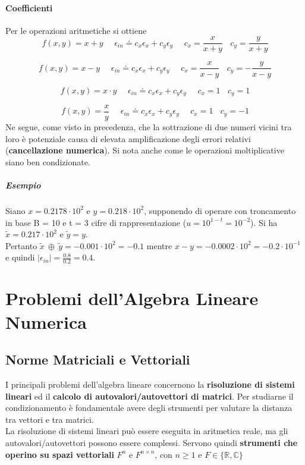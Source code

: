 \documentclass[10pt]{book}
\begin{document}
\subsubsection{Coefficienti}
Per le operazioni aritmetiche si ottiene
$$f(x, y) = x + y\:\:\:\:\:\:\epsilon_{in} \doteq c_x\epsilon_x + c_y\epsilon_y\:\:\:\:\:\:c_x=\frac{x}{x + y}\:\:\:\:c_y = \frac{y}{x + y}$$

$$f(x, y) = x - y\:\:\:\:\:\:\epsilon_{in} \doteq c_x\epsilon_x + c_y\epsilon_y\:\:\:\:\:\:c_x=\frac{x}{x - y}\:\:\:\:c_y = -\frac{y}{x - y}$$

$$f(x, y) = x \cdot y\:\:\:\:\:\:\epsilon_{in} \doteq c_x\epsilon_x + c_y\epsilon_y\:\:\:\:\:\:c_x= 1\:\:\:\:c_y = 1$$

$$f(x, y) = \frac{x}{y}\:\:\:\:\:\:\epsilon_{in} \doteq c_x\epsilon_x + c_y\epsilon_y\:\:\:\:\:\:c_x= 1\:\:\:\:c_y = -1$$
Ne segue, come visto in precedenza, che la sottrazione di due numeri vicini tra loro è potenziale causa di elevata amplificazione degli errori relativi (\textbf{cancellazione numerica}). Si nota anche come le operazioni moltiplicative siano ben condizionate.
\paragraph{Esempio} Siano $x = 0.2178\cdot10^2$ e $y = 0.218\cdot10^2$, supponendo di operare con troncamento in base B = 10 e t = 3 cifre di rappresentazione ($u = 10^{1 - t} = 10^{-2}$). Si ha $\tilde{x} = 0.217\cdot10^2$ e $\tilde{y} = y$.\\
Pertanto $\tilde{x}\:\oplus\:\tilde{y} = -0.001\cdot10^2 = -0.1$ mentre $x - y = -0.0002\cdot10^2 = -0.2\cdot10^{-1}$ e quindi $|\epsilon_{in}| = \frac{0.8}{0.2} = 0.4$.
\chapter{Problemi dell'Algebra Lineare Numerica}
\section{Norme Matriciali e Vettoriali}
I principali problemi dell'algebra lineare concernono la \textbf{risoluzione di sistemi lineari} ed il \textbf{calcolo di autovalori/autovettori di matrici}. Per studiarne il condizionamento è fondamentale avere degli strumenti per valutare la distanza tra vettori e tra matrici.\\
La risoluzione di sistemi lineari può essere eseguita in aritmetica reale, ma gli autovalori/autovettori possono essere complessi. Servono quindi \textbf{strumenti che operino su spazi vettoriali} $F^n$ e $F^{n \times n}$, con $n \geq 1$ e $F \in \{\mathbb{R}, \mathbb{C}\}$
\end{document}
